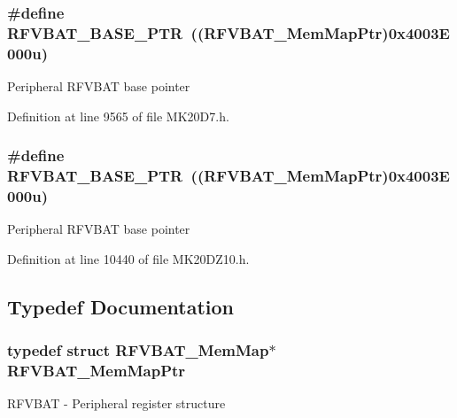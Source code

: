 \subsubsection[{\texorpdfstring{R\+F\+V\+B\+A\+T\+\_\+\+B\+A\+S\+E\+\_\+\+P\+TR}{RFVBAT_BASE_PTR}}]{\setlength{\rightskip}{0pt plus 5cm}\#define R\+F\+V\+B\+A\+T\+\_\+\+B\+A\+S\+E\+\_\+\+P\+TR~(({\bf R\+F\+V\+B\+A\+T\+\_\+\+Mem\+Map\+Ptr})0x4003\+E000u)}\hypertarget{group___r_f_v_b_a_t___peripheral_ga5b6418d9be20f84b2190ccf6134b7ba3}{}\label{group___r_f_v_b_a_t___peripheral_ga5b6418d9be20f84b2190ccf6134b7ba3}
Peripheral R\+F\+V\+B\+AT base pointer 

Definition at line 9565 of file M\+K20\+D7.\+h.

\subsubsection[{\texorpdfstring{R\+F\+V\+B\+A\+T\+\_\+\+B\+A\+S\+E\+\_\+\+P\+TR}{RFVBAT_BASE_PTR}}]{\setlength{\rightskip}{0pt plus 5cm}\#define R\+F\+V\+B\+A\+T\+\_\+\+B\+A\+S\+E\+\_\+\+P\+TR~(({\bf R\+F\+V\+B\+A\+T\+\_\+\+Mem\+Map\+Ptr})0x4003\+E000u)}\hypertarget{group___r_f_v_b_a_t___peripheral_ga5b6418d9be20f84b2190ccf6134b7ba3}{}\label{group___r_f_v_b_a_t___peripheral_ga5b6418d9be20f84b2190ccf6134b7ba3}
Peripheral R\+F\+V\+B\+AT base pointer 

Definition at line 10440 of file M\+K20\+D\+Z10.\+h.



\subsection{Typedef Documentation}
\subsubsection[{\texorpdfstring{R\+F\+V\+B\+A\+T\+\_\+\+Mem\+Map\+Ptr}{RFVBAT_MemMapPtr}}]{\setlength{\rightskip}{0pt plus 5cm}typedef struct {\bf R\+F\+V\+B\+A\+T\+\_\+\+Mem\+Map}$\ast$ {\bf R\+F\+V\+B\+A\+T\+\_\+\+Mem\+Map\+Ptr}}\hypertarget{group___r_f_v_b_a_t___peripheral_gaf818ad4cab94790b0374758504777f4f}{}\label{group___r_f_v_b_a_t___peripheral_gaf818ad4cab94790b0374758504777f4f}
R\+F\+V\+B\+AT -\/ Peripheral register structure 

